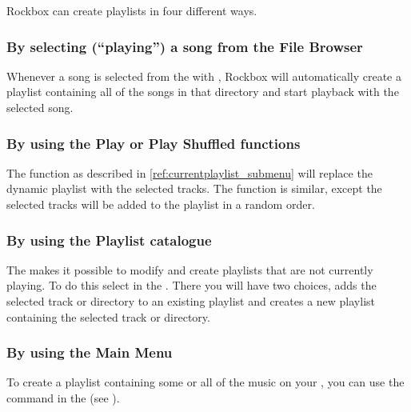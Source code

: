 Rockbox can create playlists in four different ways.

\subsubsection{By selecting (``playing'') a song from the File Browser}
Whenever a song is selected from the  with
\ActionTreeEnter, Rockbox will automatically create a playlist containing
all of the songs in that directory and start playback with the selected
song.


\subsubsection{By using the Play or Play Shuffled functions}
The  function as described in \ref{ref:currentplaylist_submenu}
will replace the dynamic playlist with the selected tracks. The  function is similar, except the selected tracks will be added to the
playlist in a random order.

\subsubsection{\label{ref:playlist_catalogue}By using the Playlist catalogue}
The  makes it possible to modify and create
playlists that are not currently playing. To do this select  in the . There you will have two choices,
 adds the selected track or directory to an existing
playlist and  creates a new playlist containing
the selected track or directory.


\subsubsection{By using the Main Menu}
To create a playlist containing some or all of the music on your \dap{}, you can use the
 command in the 
(see ).

